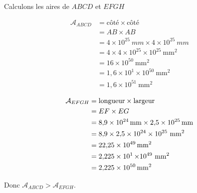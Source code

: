 \documentclass[../Cours.tex]{subfiles}
\begin{document}
\begin{questions}
    \exercice
        \question Calculons les aires de $ABCD$ et $EFGH$\\
        \noindent\begin{minipage}{0.5\linewidth}
        \begin{align*}
            \mathcal{A}_{ABCD} &= \mbox{côté} \times \mbox{côté} \\
            &= AB \times AB \\
            &= 4 \times 10^{25}~\unit{mm} \times 4 \times 10^{25}~\unit{mm} \\
            &= 4 \times 4 \times 10^{25} \times 10^{25}~\unit{\milli\metre\squared} \\
            &= 16 \times 10^{50}~\unit{\milli\metre\squared} \\
            &= 1,6 \times 10^1 \times 10^{50}~\unit{\milli\metre\squared} \\
            &= 1,6 \times 10^{51}~\unit{\milli\metre\squared}
        \end{align*}\end{minipage}
        \begin{minipage}{0.5\linewidth}
        \begin{align*}
            \mathcal{A}_{EFGH} &= \mbox{longueur} \times \mbox{largeur} \\
            &= EF \times EG \\
            &= \qty{8.9e24}{mm} \times \qty{2.5e25}{mm} \\
            &= \num{8.9} \times \num{2.5} \times 10^{24} \times 10^{25} ~\unit{mm\squared} \\
            &= \qty{22.25e49}{mm\squared} \\
            &= \qty{2.225e1} \times 10^{49} ~\unit{mm\squared} \\
            &= \qty{2.225e50}{mm\squared}
        \end{align*}
        \end{minipage}

        \centerline{Donc $\mathcal{A}_{ABCD} > \mathcal{A}_{EFGH}$.}


\end{questions}
\end{document}
